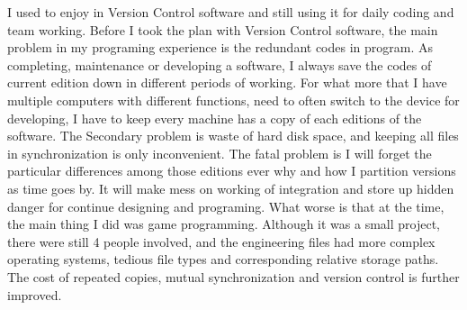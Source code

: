 \documentclass{article}
\begin{document}
\indent I used to enjoy in Version Control software and still using it for daily coding and team working. Before I took the plan with Version Control software, the main problem in my programing experience is the redundant codes in program. As completing, maintenance or developing a software, I always save the codes of current edition down in different periods of working. For what more that I have multiple computers with different functions, need to often switch to the device for developing, I have to keep every machine has a copy of each editions of the software. The Secondary problem is waste of hard disk space, and keeping all files in synchronization is only inconvenient. The fatal problem is I will forget the particular differences among those editions ever why and how I partition versions as time goes by. It will make mess on working of integration and store up hidden danger for continue designing and programing. What worse is that at the time, the main thing I did was game programming. Although it was a small project, there were still 4 people involved, and the engineering files had more complex operating systems, tedious file types and corresponding relative storage paths. The cost of repeated copies, mutual synchronization and version control is further improved.
\end{document}
